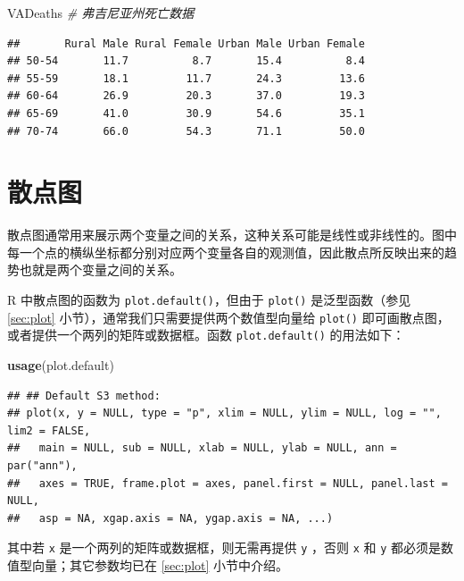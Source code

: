 \documentclass[
  b5paper,
  UTF8,twoside]{book}
\newenvironment{Shaded}{\begin{snugshade}}{\end{snugshade}}
\newcommand{\CommentTok}[1]{\textcolor[rgb]{0.56,0.35,0.01}{\textit{#1}}}
\newcommand{\FunctionTok}[1]{\textcolor[rgb]{0.13,0.29,0.53}{\textbf{#1}}}
\newcommand{\NormalTok}[1]{#1}
\begin{document}
\begin{Shaded}
\begin{Highlighting}[]
\NormalTok{VADeaths }\CommentTok{\# 弗吉尼亚州死亡数据}
\end{Highlighting}
\end{Shaded}

\begin{verbatim}
##       Rural Male Rural Female Urban Male Urban Female
## 50-54       11.7          8.7       15.4          8.4
## 55-59       18.1         11.7       24.3         13.6
## 60-64       26.9         20.3       37.0         19.3
## 65-69       41.0         30.9       54.6         35.1
## 70-74       66.0         54.3       71.1         50.0
\end{verbatim}

\section{散点图}\label{sec:plot-default}

散点图通常用来展示两个变量之间的关系，这种关系可能是线性或非线性的。图中每一个点的横纵坐标都分别对应两个变量各自的观测值，因此散点所反映出来的趋势也就是两个变量之间的关系。

R 中散点图的函数为 \texttt{plot.default()}，但由于 \texttt{plot()} 是泛型函数（参见 \ref{sec:plot} 小节），通常我们只需要提供两个数值型向量给 \texttt{plot()} 即可画散点图，或者提供一个两列的矩阵或数据框。函数 \texttt{plot.default()} 的用法如下：

\begin{Shaded}
\begin{Highlighting}[]
\FunctionTok{usage}\NormalTok{(plot.default)}
\end{Highlighting}
\end{Shaded}

\begin{verbatim}
## ## Default S3 method:
## plot(x, y = NULL, type = "p", xlim = NULL, ylim = NULL, log = "", lim2 = FALSE,
##   main = NULL, sub = NULL, xlab = NULL, ylab = NULL, ann = par("ann"),
##   axes = TRUE, frame.plot = axes, panel.first = NULL, panel.last = NULL,
##   asp = NA, xgap.axis = NA, ygap.axis = NA, ...)
\end{verbatim}

其中若 \texttt{x} 是一个两列的矩阵或数据框，则无需再提供 \texttt{y} ，否则 \texttt{x} 和 \texttt{y} 都必须是数值型向量；其它参数均已在 \ref{sec:plot} 小节中介绍。
\end{document}
